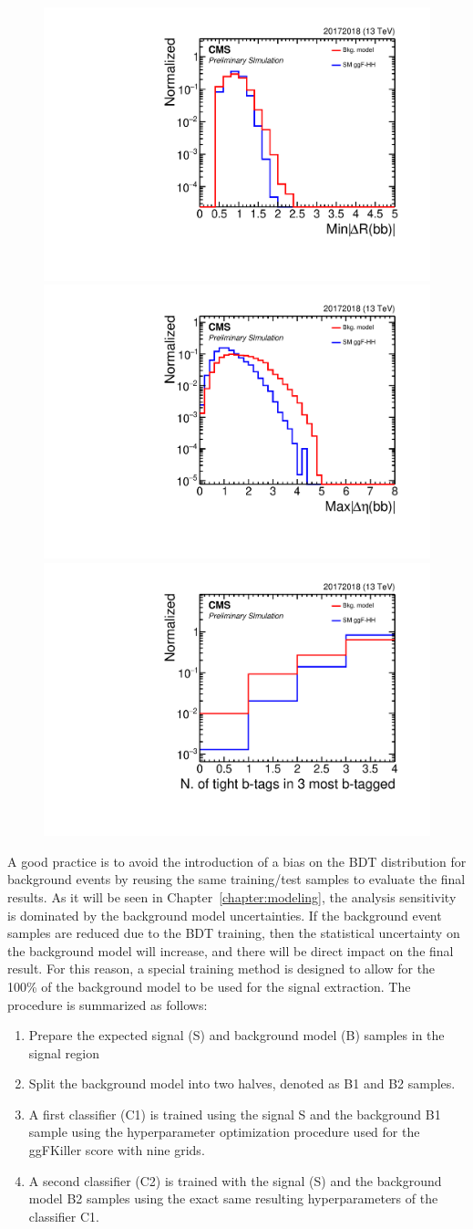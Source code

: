 \begin{figure}[ht!]
\begin{center}
\includegraphics[width=0.24\linewidth]{Figures/AnalysisStrategy/signalobservables/ggfcategories//20172018ggfmva2/plot_20172018_h_min_4b_deltaR.pdf}
\includegraphics[width=0.24\linewidth]{Figures/AnalysisStrategy/signalobservables/ggfcategories//20172018ggfmva2/plot_20172018_h_max_4b_deltaEta.pdf}
\includegraphics[width=0.24\linewidth]{Figures/AnalysisStrategy/signalobservables/ggfcategories//20172018ggfmva2/plot_20172018_h_nBtagTight.pdf}
\end{center}
\end{figure}


\clearpage

A good practice is to avoid the introduction of a bias on the BDT distribution for background events by reusing the same training/test samples to evaluate the final results.  As it will be seen in Chapter~\ref{chapter:modeling}, the analysis sensitivity is dominated by the background model uncertainties. If the background event samples are reduced due to the BDT training, then the statistical uncertainty on the background model will increase, and there will be direct impact on the final result. For this reason, a special training method is designed to allow for the 100\% of the background model to be used for the signal extraction. The procedure is summarized as follows:
\begin{enumerate}
  \item Prepare the expected signal (S) and background model (B) samples in the signal region
  \item Split the background model into two halves, denoted as B1 and B2 samples.
  \item A first classifier (C1) is trained using the signal S and the background B1 sample using the hyperparameter optimization procedure used for the ggFKiller score with nine grids. %
  \item A second classifier (C2) is trained with the signal (S) and the background model B2 samples using the exact same resulting hyperparameters of the classifier C1. 
\end{enumerate}

